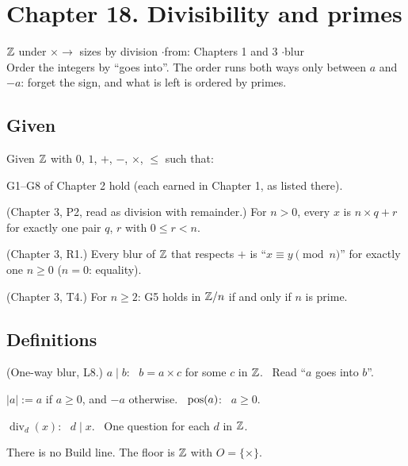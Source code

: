 \section*{Chapter 18. Divisibility and primes}
\begin{center}
{\normalsize $\mathbb{Z}$ under $\times \to$ sizes by division \quad$\cdot$\quad from: Chapters 1 and 3 \quad$\cdot$\quad blur}\\[4pt]
{\small Order the integers by ``goes into''. The order runs both ways only between $a$ and $-a$: forget the sign, and what is left is ordered by primes.}
\end{center}

\subsection*{Given}

Given $\mathbb{Z}$ with $0$, $1$, $+$, $-$, $\times$, $\le$ such that:
\begin{lines}
\item[\lab{G1}] G1--G8 of Chapter 2 hold (each earned in Chapter 1, as listed there).
\item[\lab{G2}] (Chapter 3, P2, read as division with remainder.) For $n > 0$, every $x$ is $n \times q + r$ for exactly one pair $q$, $r$ with $0 \le r < n$.
\item[\lab{G3}] (Chapter 3, R1.) Every blur of $\mathbb{Z}$ that respects $+$ is ``$x \equiv y \pmod n$'' for exactly one $n \ge 0$ ($n = 0$: equality).
\item[\lab{G4}] (Chapter 3, T4.) For $n \ge 2$: G5 holds in $\mathbb{Z}/n$ if and only if $n$ is prime.
\end{lines}

\subsection*{Definitions}

\begin{lines}
\item[\lab{D1}] (One-way blur, L8.) $a \mid b$: \ $b = a \times c$ for some $c$ in $\mathbb{Z}$. \ Read ``$a$ goes into $b$''.
\item[\lab{D2}] $|a| := a$ if $a \ge 0$, and $-a$ otherwise. \ $\operatorname{pos}(a)$: \ $a \ge 0$.
\item[\lab{D3}] $\operatorname{div}_d(x)$: \ $d \mid x$. \ One question for each $d$ in $\mathbb{Z}$.
\end{lines}
There is no Build line. The floor is $\mathbb{Z}$ with $O = \{\times\}$.


